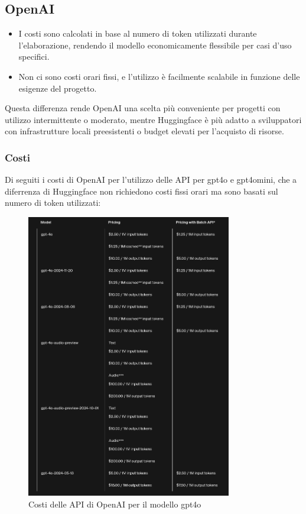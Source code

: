\documentclass{article}
\begin{document}
\subsection{OpenAI}
\begin{itemize}
    \item I costi sono calcolati in base al numero di token utilizzati durante l'elaborazione, rendendo il modello economicamente flessibile per casi d'uso specifici.
    \item Non ci sono costi orari fissi, e l'utilizzo è facilmente scalabile in funzione delle esigenze del progetto.
\end{itemize}

Questa differenza rende OpenAI una scelta più conveniente per progetti con utilizzo intermittente o moderato, mentre Huggingface è più adatto a sviluppatori con infrastrutture locali preesistenti o budget elevati per l'acquisto di risorse.

\subsubsection{Costi}
Di seguiti i costi di OpenAI per l'utilizzo delle API per gpt4o e gpt4omini, che a diferrenza di Huggingface non richiedono costi fissi orari ma sono basati sul numero di token utilizzati: 
\begin{figure}[H]
    \centering
    \includegraphics[width=0.8\textwidth]{img/costi_gpt4o.png}
    \caption{Costi delle API di OpenAI per il modello gpt4o}
    \label{fig:costi_openai_gpt4o}
\end{figure}
\end{document}
